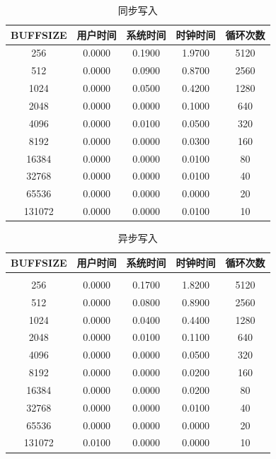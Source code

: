 \documentclass[a4paper,twoside]{article}
\begin{document}
\begin{spacing}{1.2}
\begin{table}[H]
\centering
\caption{同步写入}
\begin{tabular}{c|c|c|c|c}
	\toprule
	\hline
	BUFFSIZE & 用户时间 & 系统时间 & 时钟时间 & 循环次数 \\
	\hline
	256      &0.0000&  0.1900&  1.9700& 5120
	\\512      &0.0000&  0.0900&  0.8700& 2560
	\\1024     &0.0000&  0.0500&  0.4200& 1280
	\\2048     &0.0000&  0.0000&  0.1000& 640
	\\4096     &0.0000&  0.0100&  0.0500& 320
	\\8192     &0.0000&  0.0000&  0.0300& 160
	\\16384    &0.0000&  0.0000&  0.0100& 80
	\\32768    &0.0000&  0.0000&  0.0100& 40
	\\65536    &0.0000&  0.0000&  0.0000& 20
	\\131072   &0.0000&  0.0000&  0.0100& 10\\
	\hline
	\bottomrule
\end{tabular}	
\end{table}

\begin{table}[H]
\centering
\caption{异步写入}
\begin{tabular}{c|c|c|c|c}
	\toprule
	\hline
	BUFFSIZE & 用户时间 & 系统时间 & 时钟时间 & 循环次数 \\
	\hline
	\\256    &  0.0000 & 0.1700 & 1.8200 & 5120
	\\512    &  0.0000 & 0.0800 & 0.8900 & 2560
	\\1024   &  0.0000 & 0.0400 & 0.4400 & 1280
	\\2048   &  0.0000 & 0.0100 & 0.1100 & 640
	\\4096   &  0.0000 & 0.0000 & 0.0500 & 320
	\\8192   &  0.0000 & 0.0000 & 0.0200 & 160
	\\16384  &  0.0000 & 0.0000 & 0.0200 & 80
	\\32768  &  0.0000 & 0.0000 & 0.0100 & 40
	\\65536  &  0.0000 & 0.0000 & 0.0000 & 20
	\\131072 &  0.0100 & 0.0000 & 0.0000 & 10\\
	\hline
	\bottomrule
\end{tabular}	
\end{table}


\end{spacing}
\end{document}
